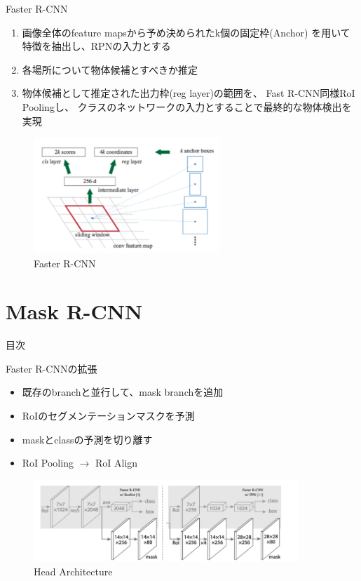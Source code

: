 \documentclass[aspectratio=169, dvipdfmx, 11pt]{beamer}
\begin{document}
\begin{frame}{Faster R-CNN}
    \begin{enumerate}
        \item 画像全体のfeature mapsから予め決められたk個の固定枠(Anchor)
        を用いて特徴を抽出し、RPNの入力とする \\
        \item 各場所について物体候補とすべきか推定 \\
        \item 物体候補として推定された出力枠(reg layer)の範囲を、
        Fast R-CNN同様RoI Poolingし、
        クラスのネットワークの入力とすることで最終的な物体検出を実現 \\
    \end{enumerate}
    \begin{figure}
        \centering
		\includegraphics[width=7cm]{./figures/anchor.png}
        \caption{Faster R-CNN}
    \end{figure}
\end{frame}


\section{Mask R-CNN}
\begin{frame}{目次}
    \tableofcontents[currentsection]
\end{frame}

\begin{frame}{Faster R-CNNの拡張}
    \begin{itemize}
        \item 既存のbranchと並行して、mask branchを追加 \\
        \item RoIのセグメンテーションマスクを予測 \\
        \item maskとclassの予測を切り離す \\
        \item RoI Pooling $\rightarrow$ RoI Align \\
    \end{itemize}

    \begin{figure}[htbp]
        \centering
		\includegraphics[width=10cm]{./figures/mask1.png}
        \caption{Head Architecture}
    \end{figure}
\end{frame}
\end{document}
